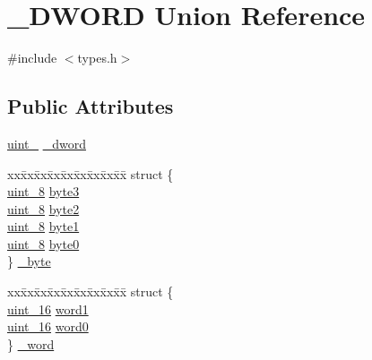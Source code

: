 \hypertarget{union___d_w_o_r_d}{}\section{\+\_\+\+D\+W\+O\+RD Union Reference}
\label{union___d_w_o_r_d}


{\ttfamily \#include $<$types.\+h$>$}

\subsection*{Public Attributes}
\begin{DoxyCompactItemize}
\item 
\hyperlink{types_8h_a5532400b872b4aa84e54335bf458a318}{uint\+\_} \hyperlink{union___d_w_o_r_d_aacbc5d28a26953bada8a4afd060f956e}{\+\_\+dword}
\item 
\begin{tabbing}
xx\=xx\=xx\=xx\=xx\=xx\=xx\=xx\=xx\=\kill
struct \{\\
\>\hyperlink{types_8h_ad3209046c23f739a81581c10a4be7d92}{uint\_8} \hyperlink{union___d_w_o_r_d_a8e3a8ca76e9d95d704ccdda0899dc2c5}{byte3}\\
\>\hyperlink{types_8h_ad3209046c23f739a81581c10a4be7d92}{uint\_8} \hyperlink{union___d_w_o_r_d_abdb31d858ae45065544ffaf444ab0de3}{byte2}\\
\>\hyperlink{types_8h_ad3209046c23f739a81581c10a4be7d92}{uint\_8} \hyperlink{union___d_w_o_r_d_ad8d15d0b4c659a8247cfba038137a747}{byte1}\\
\>\hyperlink{types_8h_ad3209046c23f739a81581c10a4be7d92}{uint\_8} \hyperlink{union___d_w_o_r_d_a1f2ec2b51fa732b65371bc99bbab021f}{byte0}\\
\} \hyperlink{union___d_w_o_r_d_a50827e5f4ceade4e5bf6f5e38a86e18b}{\_byte}\\

\end{tabbing}\item 
\begin{tabbing}
xx\=xx\=xx\=xx\=xx\=xx\=xx\=xx\=xx\=\kill
struct \{\\
\>\hyperlink{types_8h_a8ab774e38493b7c7e4d8edfd5004e66b}{uint\_16} \hyperlink{union___d_w_o_r_d_a389e85e8ecf00275da6b289f3b688abb}{word1}\\
\>\hyperlink{types_8h_a8ab774e38493b7c7e4d8edfd5004e66b}{uint\_16} \hyperlink{union___d_w_o_r_d_a519a9ce96a9d75931d3e7371a651dc6f}{word0}\\
\} \hyperlink{union___d_w_o_r_d_a03dd84d57efa345b13d0d623d65ce858}{\_word}\\


\end{tabbing}
\end{DoxyCompactItemize}
